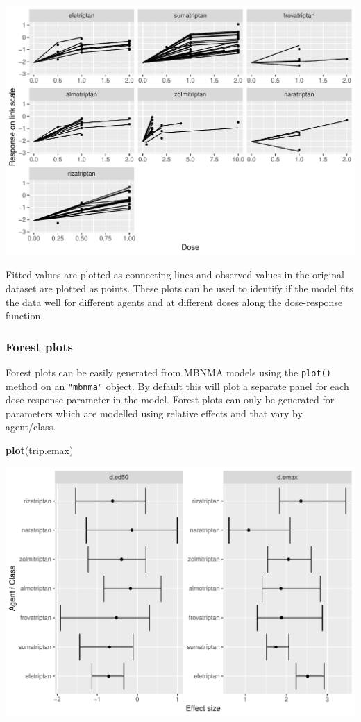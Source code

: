 \documentclass[]{article}
\newenvironment{Shaded}{\begin{snugshade}}{\end{snugshade}}
\newcommand{\KeywordTok}[1]{\textcolor[rgb]{0.13,0.29,0.53}{\textbf{#1}}}
\newcommand{\NormalTok}[1]{#1}
\begin{document}
\includegraphics{mbnmadose_files/figure-latex/unnamed-chunk-35-1.pdf}

Fitted values are plotted as connecting lines and observed values in the
original dataset are plotted as points. These plots can be used to
identify if the model fits the data well for different agents and at
different doses along the dose-response function.

\hypertarget{forest-plots}{%
\subsubsection{Forest plots}\label{forest-plots}}

Forest plots can be easily generated from MBNMA models using the
\texttt{plot()} method on an \texttt{"mbnma"} object. By default this
will plot a separate panel for each dose-response parameter in the
model. Forest plots can only be generated for parameters which are
modelled using relative effects and that vary by agent/class.

\begin{Shaded}
\begin{Highlighting}[]
\KeywordTok{plot}\NormalTok{(trip.emax)}
\end{Highlighting}
\end{Shaded}

\includegraphics{mbnmadose_files/figure-latex/unnamed-chunk-36-1.pdf}
\end{document}

